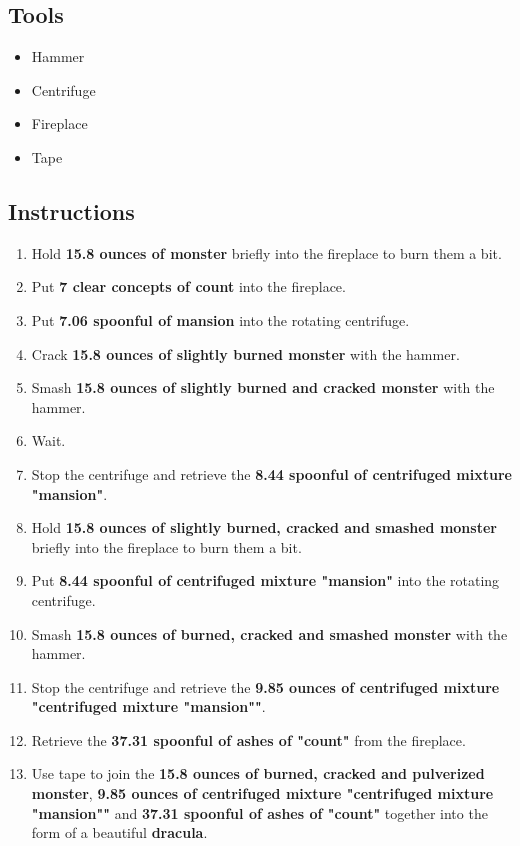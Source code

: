 \documentclass{article}
\begin{document}
\subsection{Tools}\begin{itemize}
\item 
Hammer
\item 
Centrifuge
\item 
Fireplace
\item 
Tape
\end{itemize}
\subsection{Instructions}\begin{enumerate}
\item 
Hold \textbf{15.8 ounces of monster} briefly into the fireplace to burn them a bit.
\item 
Put \textbf{7 clear concepts of count} into the fireplace.
\item 
Put \textbf{7.06 spoonful of mansion} into the rotating centrifuge.
\item 
Crack \textbf{15.8 ounces of slightly burned monster} with the hammer.
\item 
Smash \textbf{15.8 ounces of slightly burned and cracked monster} with the hammer.
\item 
Wait.
\item 
Stop the centrifuge and retrieve the \textbf{8.44 spoonful of centrifuged mixture "mansion"}.
\item 
Hold \textbf{15.8 ounces of slightly burned, cracked and smashed monster} briefly into the fireplace to burn them a bit.
\item 
Put \textbf{8.44 spoonful of centrifuged mixture "mansion"} into the rotating centrifuge.
\item 
Smash \textbf{15.8 ounces of burned, cracked and smashed monster} with the hammer.
\item 
Stop the centrifuge and retrieve the \textbf{9.85 ounces of centrifuged mixture "centrifuged mixture "mansion""}.
\item 
Retrieve the \textbf{37.31 spoonful of ashes of "count"} from the fireplace.
\item 
Use tape to join the \textbf{15.8 ounces of burned, cracked and pulverized monster}, \textbf{9.85 ounces of centrifuged mixture "centrifuged mixture "mansion""} and \textbf{37.31 spoonful of ashes of "count"} together into the form of a beautiful \textbf{dracula}.
\end{enumerate}
\newpage
\end{document}

